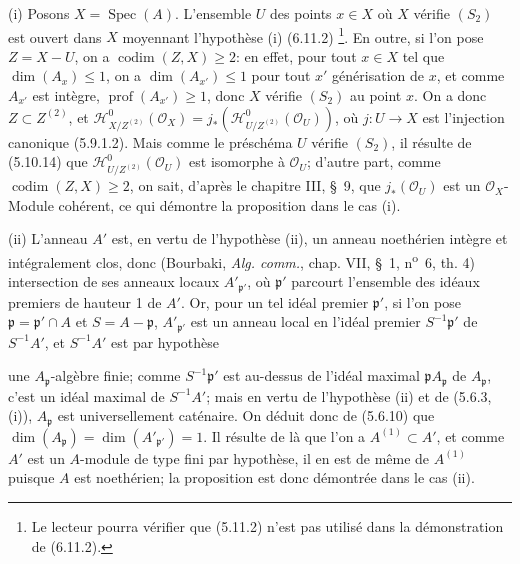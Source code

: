 \documentclass[10pt,oneside]{book}
\newcommand{\oldpage}[2][]{%
  \setcounter{footnote}{0}%
  \marginpar{\scriptsize\textbf{#1}~|~#2}\ignorespaces}
\begin{document}
(i) Posons $X=\operatorname{Spec}(A)$. L'ensemble $U$ des points $x\in X$ où
$X$ vérifie $(S_2)$ est ouvert dans $X$ moyennant l'hypothèse (i) (6.11.2)
\footnote{Le lecteur pourra vérifier que (5.11.2) n'est pas utilisé dans la
démonstration de (6.11.2).}. En outre, si l'on pose $Z=X-U$, on a
$\operatorname{codim}(Z,X)\geq2$: en effet, pour tout $x\in X$ tel que
$\dim(A_x)\leq1$, on a $\dim(A_{x'})\leq1$ pour tout $x'$ générisation de
$x$, et comme $A_{x'}$ est intègre, $\operatorname{prof}(A_{x'})\geq1$, donc
$X$ vérifie $(S_2)$ au point $x$. On a donc $Z\subset Z^{(2)}$, et
$\mathcal H^0_{X/Z^{(2)}}(\mathcal O_X)
=j_*(\mathcal H^0_{U/Z^{(2)}}(\mathcal O_U))$, où $j:U\to X$ est l'injection
canonique (5.9.1.2). Mais comme le préschéma $U$ vérifie $(S_2)$, il résulte de
(5.10.14) que $\mathcal H^0_{U/Z^{(2)}}(\mathcal O_U)$ est isomorphe à
$\mathcal O_U$; d'autre part, comme $\operatorname{codim}(Z,X)\geq2$, on sait,
d'après le chapitre III, \S~9, que $j_*(\mathcal O_U)$ est un
$\mathcal O_X$-Module cohérent, ce qui démontre la proposition dans le cas
(i).

(ii) L'anneau $A'$ est, en vertu de l'hypothèse (ii), un anneau noethérien
intègre et intégralement clos, donc (Bourbaki, \emph{Alg. comm.}, chap. VII,
\S~1, n\textsuperscript{o}~6, th. 4) intersection de ses anneaux locaux
$A'_{\mathfrak p'}$, où $\mathfrak p'$ parcourt l'ensemble des idéaux premiers
de hauteur 1 de $A'$. Or, pour un tel idéal premier $\mathfrak p'$, si l'on
pose $\mathfrak p=\mathfrak p'\cap A$ et $S=A-\mathfrak p$,
$A'_{\mathfrak p'}$ est un anneau local en l'idéal premier
$S^{-1}\mathfrak p'$ de $S^{-1}A'$, et $S^{-1}A'$ est par hypothèse

\oldpage[IV-2]{124}

une $A_\mathfrak p$-algèbre finie; comme $S^{-1}\mathfrak p'$ est au-dessus
de l'idéal maximal $\mathfrak pA_\mathfrak p$ de $A_\mathfrak p$, c'est un
idéal maximal de $S^{-1}A'$; mais en vertu de l'hypothèse (ii) et de (5.6.3,
(i)), $A_\mathfrak p$ est universellement caténaire. On déduit donc de
(5.6.10) que
$\dim(A_\mathfrak p)=\dim(A'_{\mathfrak p'})=1$. Il résulte de là que l'on a
$A^{(1)}\subset A'$, et comme $A'$ est un $A$-module de type fini par
hypothèse, il en est de même de $A^{(1)}$ puisque $A$ est noethérien; la
proposition est donc démontrée dans le cas (ii).
\end{document}
